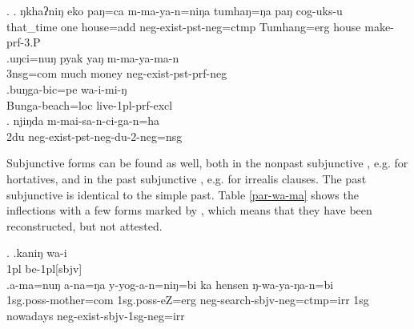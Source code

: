 \ex. \ag.     ŋkhaʔniŋ eko paŋ=ca         m-ma-ya-n=niŋa       tumhaŋ=ŋa   paŋ  cog-uks-u\\
that\_time one house{\sc =add} {\sc neg-}exist{\sc [3sg]-pst-neg=ctmp} Tumhang{\sc =erg} house make{\sc -prf-3.P}\\
 
\bg.uŋci=nuŋ   pyak yaŋ  m-ma-ya-ma-n\\
{\sc 3nsg=com} much money {\sc neg-}exist{\sc [3sg]-pst-prf-neg}\\
 
\bg.buŋga-bic=pe      wa-i-mi-ŋ\\
Bunga-beach{\sc =loc} live{\sc -1pl-prf-excl}\\
 
\bg. njiŋda m-mai-sa-n-ci-ga-n=ha\\
{\sc 2du} {\sc neg-}exist{\sc -pst-neg-du-2-neg=nsg}\\
         


Subjunctive forms can be found as well, both in the nonpast subjunctive \Next[a], e.g. for hortatives, and in the past subjunctive \Next[b], e.g. for irrealis clauses. The past subjunctive is identical to the simple past.  Table \ref{par-wa-ma} shows the  inflections with a few forms marked by , which means that they  have been reconstructed, but not attested.

\ex. \ag.kaniŋ wa-i\\
{\sc 1pl} be{\sc -1pl[sbjv]}\\
\bg.a-ma=nuŋ a-na=ŋa y-yog-a-n=niŋ=bi ka hensen ŋ-wa-ya-ŋa-n=bi\\
{\sc 1sg.poss-}mother{\sc =com} {\sc 1sg.poss-}eZ{\sc =erg} {\sc neg-}search{\sc -sbjv-neg=ctmp=irr} {\sc 1sg} nowadays {\sc neg-}exist{\sc -sbjv-1sg-neg=irr} \\
 


